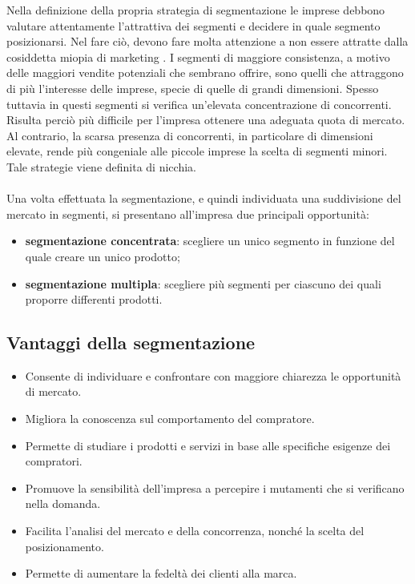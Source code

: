 Nella definizione della propria strategia di segmentazione le imprese debbono valutare attentamente l’attrattiva dei segmenti e decidere in quale segmento posizionarsi. Nel fare ciò, devono
fare molta attenzione a non essere attratte dalla cosiddetta
miopia di marketing . I segmenti di maggiore consistenza,
a motivo delle maggiori vendite potenziali che sembrano offrire, sono quelli che attraggono di più l’interesse delle imprese, specie di quelle di grandi dimensioni. Spesso tuttavia in questi segmenti si verifica un’elevata concentrazione di concorrenti. Risulta perciò più difficile per l’impresa ottenere una adeguata quota di mercato. Al contrario, la scarsa presenza di concorrenti, in particolare di dimensioni elevate, rende più congeniale alle piccole imprese la scelta di segmenti minori. Tale strategie viene definita di nicchia.
\\
\\
Una volta effettuata la segmentazione, e quindi individuata una suddivisione del mercato in segmenti, si presentano all’impresa due principali opportunità:
\begin{itemize}
	\item \textbf{segmentazione concentrata}: scegliere un unico segmento in funzione del quale creare un unico prodotto;
	\item \textbf{segmentazione multipla}: scegliere più segmenti per ciascuno dei quali proporre differenti prodotti.
\end{itemize}

\subsection{Vantaggi della segmentazione}
\begin{itemize}
	\item Consente di individuare e confrontare con maggiore chiarezza le opportunità di mercato.
	\item Migliora la conoscenza sul comportamento del
	compratore.
	\item Permette di studiare i prodotti e servizi in base alle specifiche esigenze dei compratori.
	\item Promuove la sensibilità dell’impresa a percepire i mutamenti che si verificano nella domanda.
	\item Facilita l’analisi del mercato e della concorrenza, nonché la scelta del posizionamento.
	\item Permette di aumentare la fedeltà dei clienti alla
	marca.
\end{itemize}

